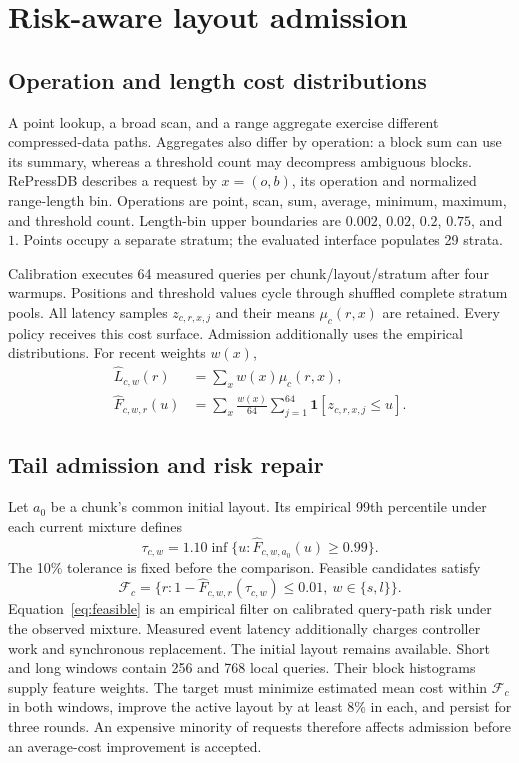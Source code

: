 \section{Risk-aware layout admission}
\label{sec:admission}
\subsection{Operation and length cost distributions}
A point lookup, a broad scan, and a range aggregate exercise different compressed-data paths. Aggregates also differ by operation: a block sum can use its summary, whereas a threshold count may decompress ambiguous blocks. RePressDB describes a request by $x=(o,b)$, its operation and normalized range-length bin. Operations are point, scan, sum, average, minimum, maximum, and threshold count. Length-bin upper boundaries are $0.002$, $0.02$, $0.2$, $0.75$, and $1$. Points occupy a separate stratum; the evaluated interface populates 29 strata.

Calibration executes 64 measured queries per chunk/layout/stratum after four warmups. Positions and threshold values cycle through shuffled complete stratum pools. All latency samples $z_{c,r,x,j}$ and their means $\mu_c(r,x)$ are retained. Every policy receives this cost surface. Admission additionally uses the empirical distributions. For recent weights $w(x)$,
\begin{align}
\widehat L_{c,w}(r)&=\sum_xw(x)\mu_c(r,x),\\
\widehat F_{c,w,r}(u)&=\sum_x\frac{w(x)}{64}\sum_{j=1}^{64}\mathbf1[z_{c,r,x,j}\leq u].
\end{align}

\subsection{Tail admission and risk repair}
Let $a_0$ be a chunk's common initial layout. Its empirical 99th percentile under each current mixture defines
\begin{equation}
\tau_{c,w}=1.10\inf\{u:\widehat F_{c,w,a_0}(u)\geq0.99\}.
\end{equation}
The 10\% tolerance is fixed before the comparison. Feasible candidates satisfy
\begin{equation}
\mathcal F_c=\{r:1-\widehat F_{c,w,r}(\tau_{c,w})\leq0.01,\ w\in\{s,l\}\}.
\label{eq:feasible}
\end{equation}
Equation~\eqref{eq:feasible} is an empirical filter on calibrated query-path risk under the observed mixture. Measured event latency additionally charges controller work and synchronous replacement. The initial layout remains available. Short and long windows contain 256 and 768 local queries. Their block histograms supply feature weights. The target must minimize estimated mean cost within $\mathcal F_c$ in both windows, improve the active layout by at least 8\% in each, and persist for three rounds. An expensive minority of requests therefore affects admission before an average-cost improvement is accepted.


